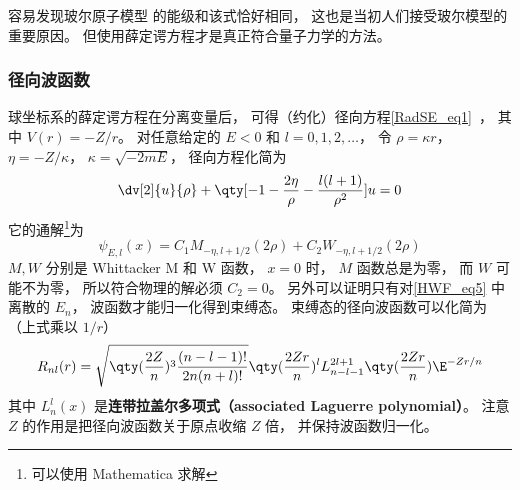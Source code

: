 容易发现玻尔原子模型 的能级和该式恰好相同， 这也是当初人们接受玻尔模型的重要原因。 但使用薛定谔方程才是真正符合量子力学的方法。

\subsubsection{径向波函数}
球坐标系的薛定谔方程在分离变量后， 可得（约化）径向方程\autoref{RadSE_eq1}~， 其中 $V(r) = -Z/r$。 对任意给定的 $E < 0$ 和 $l = 0,1,2,\dots$， 令 $\rho = \kappa r$， $\eta = -Z/\kappa$， $\kappa = \sqrt{-2mE}$， 径向方程化简为
\begin{equation}
\dv[2]{u}{\rho} + \qty[-1 - \frac{2\eta}{\rho} - \frac{l(l+1)}{\rho^2}]u = 0
\end{equation}
它的通解\footnote{可以使用 Mathematica 求解}为
\begin{equation}\label{HWF_eq6}
\psi_{E,l}(x) = C_1 M_{-\eta, l+1/2}(2 \rho) + C_2 W_{-\eta, l+1/2}(2 \rho)
\end{equation}
$M, W$ 分别是 Whittacker M 和 W 函数， $x = 0$ 时， $M$ 函数总是为零， 而 $W$ 可能不为零， 所以符合物理的解必须 $C_2 = 0$。 另外可以证明只有对\autoref{HWF_eq5} 中离散的 $E_n$， 波函数才能归一化得到束缚态。 束缚态的径向波函数可以化简为（上式乘以 $1/r$）
\begin{equation}\label{HWF_eq2}
R_{nl}(r) = \sqrt{\qty(\frac{2 Z}{n})^3 \frac{(n - l - 1)!}{2n (n + l)!}} \qty(\frac{2Zr}{n})^l  L_{n-l-1}^{2l+1}\qty(\frac{2Zr}{n}) \E^{-Zr/n}
\end{equation}
其中 $L_n^l(x)$ 是\textbf{连带拉盖尔多项式（associated Laguerre polynomial）}。 注意 $Z$ 的作用是把径向波函数关于原点收缩 $Z$ 倍， 并保持波函数归一化。

